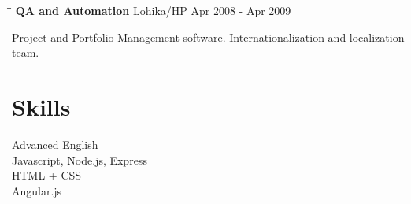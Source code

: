 \documentclass{res}
\begin{document}
\begin{resume}
   \begin{tabbing}%
   \hspace{2.3in}\= \hspace{2.6in}\= \kill         
   {\bf QA and Automation}  \>Lohika/HP \> Apr 2008 - Apr 2009\\
                          \>
   \end{tabbing}\vspace{-20pt}
    Project and Portfolio Management software. Internationalization and
    localization team.          


\section{Skills} 
    Advanced English  \\   
    Javascript, Node.js, Express\\
    HTML + CSS   \\
    Angular.js   \\
         
 
\end{resume}
\end{document}
